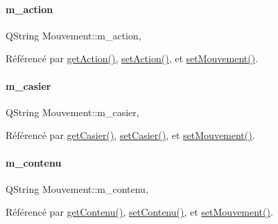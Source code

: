 \paragraph{\texorpdfstring{m\+\_\+action}{m\_action}}
{\footnotesize\ttfamily Q\+String Mouvement\+::m\+\_\+action\hspace{0.3cm}{\ttfamily [read]}, {\ttfamily [write]}}



Référencé par \hyperlink{class_mouvement_a683576b69fc9ab0bef8b85b1468408e2}{get\+Action()}, \hyperlink{class_mouvement_a2c64d36ea78ea6b428ddd0a0610411c1}{set\+Action()}, et \hyperlink{class_mouvement_a5c7f0e876b2292627e9d1bef12de03a3}{set\+Mouvement()}.

\mbox{\label{class_mouvement_a186f483cf82ff2866da1e10031838567}} 
\paragraph{\texorpdfstring{m\+\_\+casier}{m\_casier}}
{\footnotesize\ttfamily Q\+String Mouvement\+::m\+\_\+casier\hspace{0.3cm}{\ttfamily [read]}, {\ttfamily [write]}}



Référencé par \hyperlink{class_mouvement_ae3ebc2911605104452a612aaf8a48e64}{get\+Casier()}, \hyperlink{class_mouvement_ad47317b7671e3b9b7e6e060f667924a7}{set\+Casier()}, et \hyperlink{class_mouvement_a5c7f0e876b2292627e9d1bef12de03a3}{set\+Mouvement()}.

\mbox{\label{class_mouvement_a631b133243576c36fec6e1912415d7d6}} 
\paragraph{\texorpdfstring{m\+\_\+contenu}{m\_contenu}}
{\footnotesize\ttfamily Q\+String Mouvement\+::m\+\_\+contenu\hspace{0.3cm}{\ttfamily [read]}, {\ttfamily [write]}}



Référencé par \hyperlink{class_mouvement_a6a288ea183789e4b99f6f520ff7a32ab}{get\+Contenu()}, \hyperlink{class_mouvement_a07e3d77c7d7af6a74e3ac5e7eb195ff9}{set\+Contenu()}, et \hyperlink{class_mouvement_a5c7f0e876b2292627e9d1bef12de03a3}{set\+Mouvement()}.

